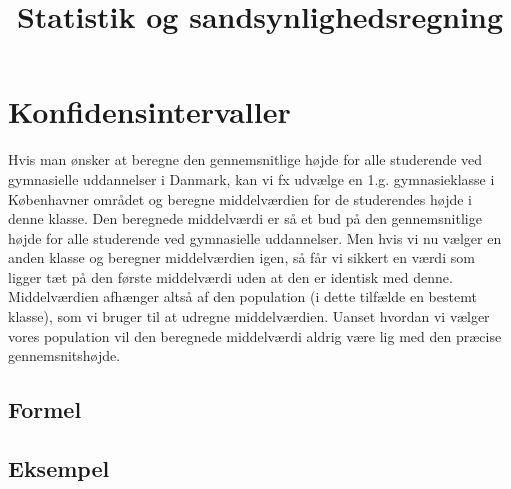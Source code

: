 \documentclass{article}
\title{Statistik og sandsynlighedsregning}
\begin{document}
\maketitle

\section{Konfidensintervaller}
Hvis man ønsker at beregne den gennemsnitlige højde for alle studerende ved gymnasielle uddannelser i Danmark, kan vi fx udvælge en 1.g. gymnasieklasse i Københavner området og beregne middelværdien for de studerendes højde i denne klasse. Den beregnede middelværdi er så et bud på den gennemsnitlige højde for alle studerende ved gymnasielle uddannelser. Men hvis vi nu vælger en anden klasse og beregner middelværdien igen, så får vi sikkert en værdi som ligger tæt på den første middelværdi uden at den er identisk med denne. Middelværdien afhænger altså af den population (i dette tilfælde en bestemt klasse), som vi bruger til at udregne middelværdien. Uanset hvordan vi vælger vores population vil den beregnede middelværdi aldrig være lig med den præcise gennemsnitshøjde.
\subsection{Formel}

\subsection{Eksempel}
\end{document}
